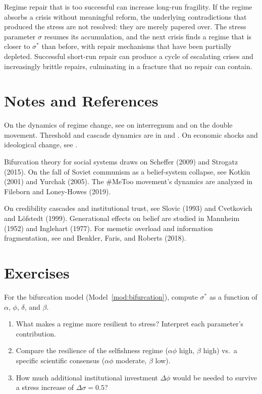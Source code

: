 \begin{remark}
\label{prop:resilience-paradox}
Regime repair that is too successful can increase long-run fragility.
If the regime absorbs a crisis without meaningful reform, the underlying contradictions that produced the stress are not resolved: they are merely papered over.
The stress parameter $\sigma$ resumes its accumulation, and the next crisis finds a regime that is closer to $\sigma^*$ than before, with repair mechanisms that have been partially depleted.
Successful short-run repair can produce a cycle of escalating crises and increasingly brittle repairs, culminating in a fracture that no repair can contain.
\end{remark}

\section{Notes and References}
\label{sec:ch30-notes}

On the dynamics of regime change, see \textcite{gramsci1971} on interregnum and \textcite{polanyi1944} on the double movement.
Threshold and cascade dynamics are in \textcite{granovetter1978} and \textcite{watts2002}.
On economic shocks and ideological change, see \textcite{klein2007}.

Bifurcation theory for social systems draws on Scheffer (2009) and Strogatz (2015).
On the fall of Soviet communism as a belief-system collapse, see Kotkin (2001) and Yurchak (2005).
The \#MeToo movement's dynamics are analyzed in Fileborn and Loney-Howes (2019).

On credibility cascades and institutional trust, see Slovic (1993) and Cvetkovich and L\"{o}fstedt (1999).
Generational effects on belief are studied in Mannheim (1952) and Inglehart (1977).
For memetic overload and information fragmentation, see \textcite{sunstein2017} and Benkler, Faris, and Roberts (2018).

\section{Exercises}

\begin{exercise}
For the bifurcation model (Model~\ref{mod:bifurcation}), compute $\sigma^*$ as a function of $\alpha$, $\phi$, $\delta$, and $\beta$.
\begin{enumerate}[nosep]
  \item What makes a regime more resilient to stress? Interpret each parameter's contribution.
  \item Compare the resilience of the selfishness regime ($\alpha\phi$ high, $\beta$ high) vs.\ a specific scientific consensus ($\alpha\phi$ moderate, $\beta$ low).
  \item How much additional institutional investment $\Delta\phi$ would be needed to survive a stress increase of $\Delta\sigma = 0.5$?
\end{enumerate}
\end{exercise}

